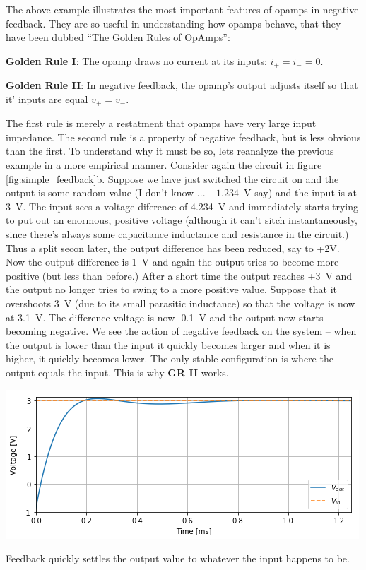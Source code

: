 \documentclass{tufte-book}
\begin{document}
The above example illustrates the most important features of opamps in negative feedback. They are so useful in understanding how opamps behave, that they have been dubbed ``The Golden Rules of OpAmps'':

\textbf{Golden Rule I}: The opamp draws no current at its inputs: $i_+ = i_- = 0$.

\textbf{Golden Rule II}: In negative feedback, the opamp's output adjusts itself so that it' inputs are equal $v_+ = v_-$.

The first rule is merely a restatment that opamps have very large input impedance. The second rule is a property of negative feedback, but is less obvious than the first. To understand why it must be so, lets reanalyze the previous example in a more empirical manner. Consider again the circuit in figure \ref{fig:simple_feedback}b. Suppose we have just switched the circuit on and the output is some random value (I don't know ... $-1.234$~V say) and the input is at 3~V. The input sees a voltage diference of 4.234~V and immediately starts trying to put out an enormous, positive voltage (although it can't sitch instantaneously, since there's always some capacitance inductance and resistance in the circuit.) Thus a split secon later, the output difference has been reduced, say to +2V. Now the output difference is 1~V and again the output tries to become more positive (but less than before.) After a short time the output reaches +3~V and the output no longer tries to swing to a more positive value. Suppose that it overshoots 3~V (due to its small parasitic inductance) so that the voltage is now at 3.1~V. The difference voltage is now -0.1~V and the output now starts becoming negative. We see the action of negative feedback on the system -- when the output is lower than the input it quickly becomes larger and when it is higher, it quickly becomes lower. The only stable configuration is where the output equals the input. This is why \textbf{GR II} works. 

\begin{marginfigure}%
  \includegraphics[width=\linewidth]{feedback_time_dep}
  \caption{Feedback quickly settles the output value to whatever the input happens to be.}
  \label{fig:feedback_time_dep}
\end{marginfigure}
\end{document}
